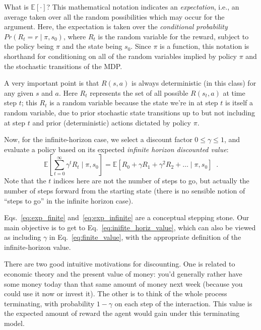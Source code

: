 \begin{examplebox}
  What is $\mathbb{E}\left[ \cdot \right ]$?  This mathematical
  notation indicates an {\em expectation}, i.e., an average
  taken over all the random possibilities which may occur for the
  argument.  Here, the expectation is taken over the {\em conditional
      probability} $Pr(R_t = r \mid \pi, s_0)$, where $R_t$ is the random
  variable for the reward, subject to the policy being $\pi$ and the
  state being $s_0$. Since $\pi$ is a function, this notation is
  shorthand for conditioning on all of the random variables implied by
  policy $\pi$ and the stochastic transitions of the MDP.

  \bigskip
  A very important point is that $R(s,a)$ is always deterministic (in this class) for
  any given $s$ and $a$. Here $R_t$ represents the set of all possible
  $R(s_t,a)$ at time step $t$; this $R_t$ is a random variable because
  the state we're in at step $t$ is itself a random variable, due to prior
  stochastic state transitions up to but not including at step $t$ and prior
  (deterministic) actions dictated by policy $\pi.$
\end{examplebox}

Now, for the infinite-horizon case, we select a discount factor $0 \leq \gamma \leq 1$,
and evaluate a policy based on its expected {\it{infinite horizon discounted value}}:
\begin{equation}
  \mathbb{E}\left[\sum_{t = 0}^{\infty}\gamma^tR_t \mid \pi, s_0\right]
  = \mathbb{E}\left[R_0  + \gamma R_1 + \gamma^2 R_2 + \ldots \mid \pi,  s_0\right] \;\;.
  \label{eq:exp_infinite}
\end{equation}
Note that the $t$ indices here are not the number of steps to go, but
actually the number of steps forward from the starting state (there is
no sensible notion  of ``steps to go'' in the infinite horizon case).

\begin{examplebox}
  Eqs.~\ref{eq:exp_finite} and~\ref{eq:exp_infinite} are a conceptual
  stepping stone. Our main objective is to get to
  Eq.~\ref{eq:inifite_horiz_value}, which can also be viewed
  as including $\gamma$ in Eq.~\ref{eq:finite_value}, with
  the appropriate definition of the infinite-horizon value.
\end{examplebox}

There are two good intuitive motivations for discounting.  One is
related to economic theory and the present value of money: you'd
generally rather have some money today than that same amount of money
next week (because you could use it now or invest it).  The other is
to think of the whole process terminating, with probability $1-\gamma$
on each step of the interaction.  This value is the expected amount of
reward the agent would gain under this terminating model.

